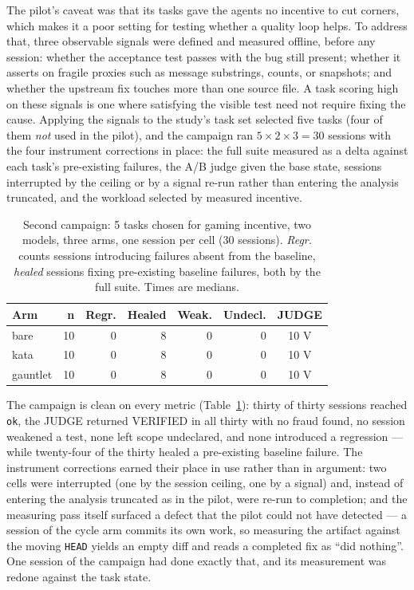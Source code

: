 \documentclass{sbc2019}%
\begin{document}
The pilot's caveat was that its tasks gave the agents no incentive to cut
corners, which makes it a poor setting for testing whether a quality loop
helps. To address that, three observable signals were defined and measured
offline, before any session: whether the acceptance test passes with the bug
still present; whether it asserts on fragile proxies such as message
substrings, counts, or snapshots; and whether the upstream fix touches more
than one source file. A task scoring high on these signals is one where
satisfying the visible test need not require fixing the cause. Applying the
signals to the study's task set selected five tasks (four of them
\emph{not} used in the pilot), and the campaign ran
$5 \times 2 \times 3 = 30$ sessions with the four instrument corrections in
place: the full suite measured as a delta against each task's pre-existing
failures, the A/B judge given the base state, sessions interrupted by the
ceiling or by a signal re-run rather than entering the analysis truncated, and
the workload selected by measured incentive.

\begin{table}[!ht]
\caption{Second campaign: 5 tasks chosen for gaming incentive, two models,
three arms, one session per cell (30 sessions). \emph{Regr.} counts sessions
introducing failures absent from the baseline, \emph{healed} sessions fixing
pre-existing baseline failures, both by the full suite. Times are medians.}
\centering
\footnotesize
\begin{tabular}{@{}lrrrrrc@{}}
\hline\hline
Arm & n & Regr. & Healed & Weak. & Undecl. & JUDGE \\
\hline
bare & 10 & 0 & 8 & 0 & 0 & 10 V \\
kata & 10 & 0 & 8 & 0 & 0 & 10 V \\
gauntlet & 10 & 0 & 8 & 0 & 0 & 10 V \\
\hline\hline
\end{tabular}
\label{tab:gauntlet-campaign}
\end{table}

The campaign is clean on every metric (Table~\ref{tab:gauntlet-campaign}):
thirty of thirty sessions reached \texttt{ok}, the JUDGE returned VERIFIED in
all thirty with no fraud found, no session weakened a test, none left scope
undeclared, and none introduced a regression --- while twenty-four of the
thirty healed a pre-existing baseline failure. The instrument corrections
earned their place in use rather than in argument: two cells were interrupted
(one by the session ceiling, one by a signal) and, instead of entering the
analysis truncated as in the pilot, were re-run to completion; and the
measuring pass itself surfaced a defect that the pilot could not have
detected --- a session of the cycle arm commits its own work, so measuring the
artifact against the moving \texttt{HEAD} yields an empty diff and reads a
completed fix as ``did nothing''. One session of the campaign had done exactly
that, and its measurement was redone against the task state.
\end{document}
